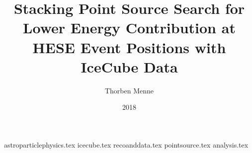 

\author{Thorben Menne}
\title{Stacking Point Source Search for Lower Energy Contribution at HESE Event Positions with IceCube Data}
\date{2018}




\frontmatter
\maketitle
\tableofcontents

\mainmatter
{astroparticlephysics.tex}
{icecube.tex}
{recoanddata.tex}
{pointsource.tex}
{analysis.tex}

\appendix

\backmatter
% 



